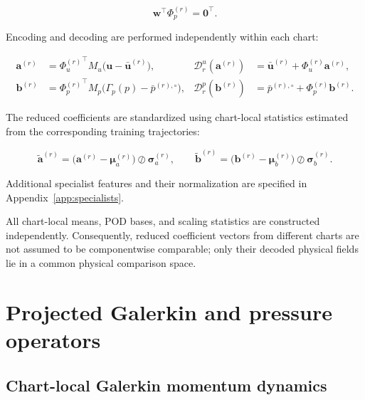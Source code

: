 \documentclass{article}
\begin{document}
\begin{equation}
    \bm w^\top\Phi_p^{(r)}=\bm 0^\top .
\end{equation}



Encoding and decoding are performed independently within each chart:


\begin{align}
    \bm a^{(r)}
    &=
    {\Phi_u^{(r)}}^\top
    M_u
    \bigl(\bm u-\bar{\bm u}^{(r)}\bigr),
    &
    \mathcal D_r^u(\bm a^{(r)})
    &=
    \bar{\bm u}^{(r)}
    +\Phi_u^{(r)}\bm a^{(r)},
    \\
    \bm b^{(r)}
    &=
    {\Phi_p^{(r)}}^\top
    M_p
    \bigl(\Gamma_p(p)-\bar p^{(r),\circ}\bigr),
    &
    \mathcal D_r^p(\bm b^{(r)})
    &=
    \bar p^{(r),\circ}
    +\Phi_p^{(r)}\bm b^{(r)}.
    \label{eq:app_encode_decode}
\end{align}



The reduced coefficients are standardized using chart-local statistics
estimated from the corresponding training trajectories:


\begin{equation}
    \widetilde{\bm a}^{(r)}
    =
    \bigl(
        \bm a^{(r)}-\bm\mu_a^{(r)}
    \bigr)
    \oslash
    \bm\sigma_a^{(r)},
    \qquad
    \widetilde{\bm b}^{(r)}
    =
    \bigl(
        \bm b^{(r)}-\bm\mu_b^{(r)}
    \bigr)
    \oslash
    \bm\sigma_b^{(r)}.
    \label{eq:app_local_scalers}
\end{equation}


Additional specialist features and their normalization are specified in
Appendix~\ref{app:specialists}.

All chart-local means, POD bases, and scaling statistics are constructed
independently.
Consequently, reduced coefficient vectors from different charts are not
assumed to be componentwise comparable; only their decoded physical fields lie in a common physical comparison space.






\section{Projected Galerkin and pressure operators}
\label{app:rom}

\subsection{Chart-local Galerkin momentum dynamics}
\end{document}

